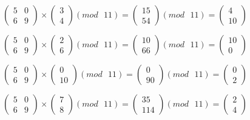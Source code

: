 \documentclass[a5paper, 10pt]{article}
\theoremstyle{definition}
\theoremstyle{plain}
\theoremstyle{remark}
\begin{document}
\begin{equation}
\begin{pmatrix}
 5 & 0\\
 6 & 9
\end{pmatrix}
 \times
\begin{pmatrix}
 3\\
4
\end{pmatrix}
(mod \text{ }11)
= 
\begin{pmatrix}
 15\\
54
\end{pmatrix}
(mod \text{ }11)
= \begin{pmatrix}
 4\\
10
\end{pmatrix}
\end{equation}

\begin{equation}
\begin{pmatrix}
 5 & 0\\
 6 & 9
\end{pmatrix}
 \times
\begin{pmatrix}
 2\\
6
\end{pmatrix}
(mod \text{ }11)
= 
\begin{pmatrix}
 10\\
66
\end{pmatrix}
(mod \text{ }11)
= \begin{pmatrix}
 10\\
0
\end{pmatrix}
\end{equation}

\begin{equation}
\begin{pmatrix}
 5 & 0\\
 6 & 9
\end{pmatrix}
 \times
\begin{pmatrix}
 0\\
10
\end{pmatrix}
(mod \text{ }11)
= 
\begin{pmatrix}
 0\\
90
\end{pmatrix}
(mod \text{ }11)
= \begin{pmatrix}
 0\\
2
\end{pmatrix}
\end{equation}

\begin{equation}
\begin{pmatrix}
 5 & 0\\
 6 & 9
\end{pmatrix}
 \times
\begin{pmatrix}
 7\\
8
\end{pmatrix}
(mod \text{ }11)
= 
\begin{pmatrix}
 35\\
114
\end{pmatrix}
(mod \text{ }11)
= \begin{pmatrix}
 2\\
4
\end{pmatrix}
\end{equation}
\end{document}
